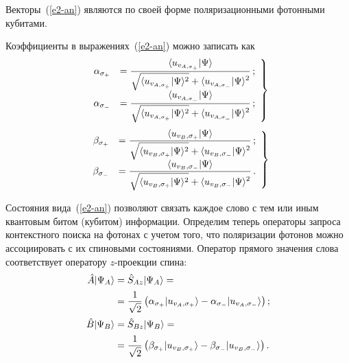 \begin{multicols}{2}
    Векторы~(\ref{e2-an})  являются по своей фор\-ме 
поляризационными фотонными кубитами.
    
    Коэффициенты в выражениях~(\ref{e2-an}) мож\-но записать 
как
    \begin{equation}
    \left.
    \begin{array}{rl}
    \alpha_{\sigma_+} &= \fr{\langle u_{v_{A,\sigma_+}}\vert \Psi\rangle} 
{\sqrt{\langle u_{v_{A,\sigma_+}}\vert \Psi\rangle^2}+\langle u_{v_{A,\sigma_-
}}\vert \Psi\rangle^2}\,; %
\\[6pt]
    \alpha_{\sigma_-} &= \fr{\langle u_{v_{A,\sigma_-}}\vert \Psi\rangle} 
{\sqrt{\langle u_{v_{A,\sigma_+}}\vert \Psi\rangle^2}+\langle u_{v_{A,\sigma_-
}}\vert \Psi\rangle^2}\,;
\end{array}
\right\}
\label{e4-an}
\end{equation}
\begin{equation}
\left.
\begin{array}{rl}
    \beta_{\sigma_+} &= \displaystyle\frac{\displaystyle \langle u_{v_B,\sigma_+}\vert \Psi\rangle\mathstrut}{\displaystyle \sqrt{\langle u_{v_B,\sigma_+}\vert \Psi\rangle^2}+\langle u_{v_B,\sigma_-}\vert 
\Psi\rangle^2\mathstrut}\,;\\[6pt]
    \beta_{\sigma_-} &= \displaystyle\frac{\displaystyle \langle u_{v_B,\sigma_-}\vert \Psi\rangle\mathstrut}{\displaystyle \sqrt{\langle u_{v_B,\sigma_+}\vert \Psi\rangle^2}+\langle u_{v_B,\sigma_-}\vert 
\Psi\rangle^2\mathstrut}\,.
\end{array}
\right\}
    \label{e6-an}
    \end{equation}
    
    Состояния вида~(\ref{e2-an}) позволяют связать каж\-дое 
слово с тем или иным квантовым битом (кубитом) информации. Определим 
теперь операторы запроса контекстного поиска на фотонах с учетом того, что 
поляризации фотонов можно ассоциировать с их спиновыми состояниями. 
Оператор прямого значения слова соответствует оператору $z$-про\-ек\-ции 
спина: 
    \begin{align*}
    \hat{A}\vert \Psi_A\rangle &= \hat{S}_{Az} \vert \Psi_A\rangle 
={}\notag\\
&{}=\displaystyle\frac{\displaystyle 1\mathstrut}{\displaystyle \sqrt{2}\mathstrut}\left( \alpha_{\sigma_+} \vert u_{v_A,\sigma_+}\rangle -
\alpha_{\sigma_-} \vert u_{v_A,\sigma_-}\rangle\right);
   \\
    \hat{B}\vert \Psi_B\rangle &= \hat{S}_{Bz} \vert \Psi_B\rangle 
={}\notag\\
&{}=\displaystyle\frac{\displaystyle 1\mathstrut}{\displaystyle \sqrt{2}\mathstrut}\left( \beta_{\sigma_+} \vert u_{v_B,\sigma_+}\rangle -
\beta_{\sigma_-} \vert u_{v_B,\sigma_-}\rangle\right).
    \end{align*}
    

\end{multicols}
